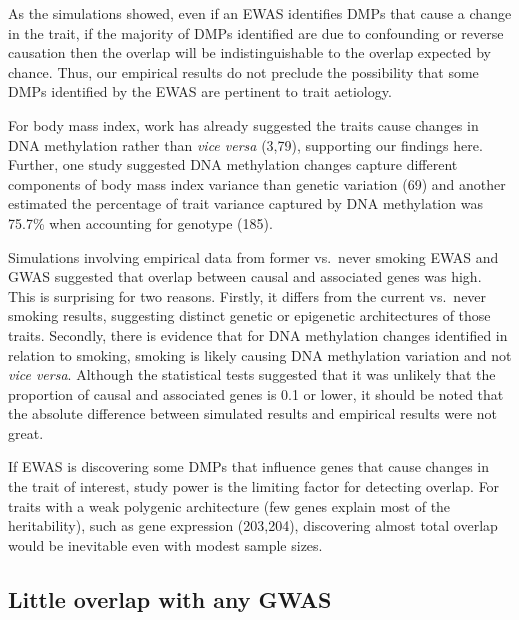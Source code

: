 \documentclass[11pt,oneside]{bristolthesis}
\begin{document}
As the simulations showed, even if an EWAS identifies DMPs that cause a change in the trait, if the majority of DMPs identified are due to confounding or reverse causation then the overlap will be indistinguishable to the overlap expected by chance. Thus, our empirical results do not preclude the possibility that some DMPs identified by the EWAS are pertinent to trait aetiology.

For body mass index, work has already suggested the traits cause changes in DNA methylation rather than \emph{vice versa} (3,79), supporting our findings here. Further, one study suggested DNA methylation changes capture different components of body mass index variance than genetic variation (69) and another estimated the percentage of trait variance captured by DNA methylation was 75.7\% when accounting for genotype (185).

Simulations involving empirical data from former vs.~never smoking EWAS and GWAS suggested that overlap between causal and associated genes was high. This is surprising for two reasons. Firstly, it differs from the current vs.~never smoking results, suggesting distinct genetic or epigenetic architectures of those traits. Secondly, there is evidence that for DNA methylation changes identified in relation to smoking, smoking is likely causing DNA methylation variation and not \emph{vice versa}. Although the statistical tests suggested that it was unlikely that the proportion of causal and associated genes is 0.1 or lower, it should be noted that the absolute difference between simulated results and empirical results were not great.

If EWAS is discovering some DMPs that influence genes that cause changes in the trait of interest, study power is the limiting factor for detecting overlap. For traits with a weak polygenic architecture (few genes explain most of the heritability), such as gene expression (203,204), discovering almost total overlap would be inevitable even with modest sample sizes.

\hypertarget{little-overlap-with-any-gwas}{%
\subsection{Little overlap with any GWAS}\label{little-overlap-with-any-gwas}}
\end{document}
